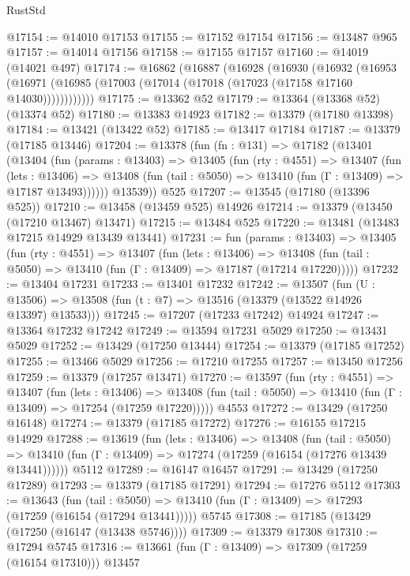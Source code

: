 \begin{lexlean}{RustStd}
\begin{coremodule}
@17154 := @14010 @17153
@17155 := @17152 @17154
@17156 := @13487 @965
@17157 := @14014 @17156
@17158 := @17155 @17157
@17160 := @14019 (@14021 @497)
@17174 := @16862
    (@16887
      (@16928
        (@16930
          (@16932
            (@16953
              (@16971 (@16985 (@17003 (@17014 (@17018 (@17023 (@17158 @17160 @14030))))))))))))
@17175 := @13362 @52
@17179 := @13364 (@13368 @52) (@13374 @52)
@17180 := @13383 @14923
@17182 := @13379 (@17180 @13398)
@17184 := @13421 (@13422 @52)
@17185 := @13417 @17184
@17187 := @13379 (@17185 @13446)
@17204 := @13378
    (fun (fn : @131) =>
    @17182
      (@13401
        (@13404
          (fun (params : @13403) =>
          @13405
            (fun (rty : @4551) =>
            @13407
              (fun (lets : @13406) =>
              @13408 (fun (tail : @5050) => @13410 (fun (Γ : @13409) => @17187 @13493))))))
        @13539))
    @525
@17207 := @13545 (@17180 (@13396 @525))
@17210 := @13458 (@13459 @525) @14926
@17214 := @13379 (@13450 (@17210 @13467) @13471)
@17215 := @13484 @525
@17220 := @13481 (@13483 @17215 @14929 @13439 @13441)
@17231 := fun (params : @13403) =>
  @13405
    (fun (rty : @4551) =>
    @13407
      (fun (lets : @13406) =>
      @13408 (fun (tail : @5050) => @13410 (fun (Γ : @13409) => @17187 (@17214 @17220)))))
@17232 := @13404 @17231
@17233 := @13401 @17232
@17242 := @13507
    (fun (U : @13506) => @13508 (fun (t : @7) => @13516 (@13379 (@13522 @14926 @13397) @13533)))
@17245 := @17207 (@17233 @17242) @14924
@17247 := @13364 @17232 @17242
@17249 := @13594 @17231 @5029
@17250 := @13431 @5029
@17252 := @13429 (@17250 @13444)
@17254 := @13379 (@17185 @17252)
@17255 := @13466 @5029
@17256 := @17210 @17255
@17257 := @13450 @17256
@17259 := @13379 (@17257 @13471)
@17270 := @13597
    (fun (rty : @4551) =>
    @13407
      (fun (lets : @13406) =>
      @13408 (fun (tail : @5050) => @13410 (fun (Γ : @13409) => @17254 (@17259 @17220)))))
    @4553
@17272 := @13429 (@17250 @16148)
@17274 := @13379 (@17185 @17272)
@17276 := @16155 @17215 @14929
@17288 := @13619
    (fun (lets : @13406) =>
    @13408
      (fun (tail : @5050) =>
      @13410 (fun (Γ : @13409) => @17274 (@17259 (@16154 (@17276 @13439 @13441))))))
    @5112
@17289 := @16147 @16457
@17291 := @13429 (@17250 @17289)
@17293 := @13379 (@17185 @17291)
@17294 := @17276 @5112
@17303 := @13643
    (fun (tail : @5050) => @13410 (fun (Γ : @13409) => @17293 (@17259 (@16154 (@17294 @13441)))))
    @5745
@17308 := @17185 (@13429 (@17250 (@16147 (@13438 @5746))))
@17309 := @13379 @17308
@17310 := @17294 @5745
@17316 := @13661 (fun (Γ : @13409) => @17309 (@17259 (@16154 @17310))) @13457

\end{coremodule}
\end{lexlean}
